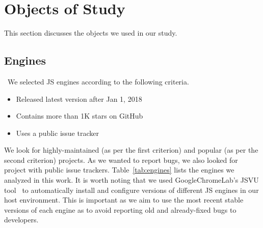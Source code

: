 \documentclass[10pt,conference,anonymous]{IEEEtran}
\begin{document}




\section{Objects of Study}
\label{sec:methodology}

This section discusses the objects we used in our study.

\subsection{Engines}
\label{sec:methodology:engines}~We selected 
JS engines according to the following criteria.

\begin{itemize}
\item Released latest version after Jan 1, 2018
\item Contains more than 1K stars on GitHub  
\item Uses a public issue tracker
\end{itemize}  

We look for highly-maintained (as per the first criterion) and popular
(as per the second criterion) projects. As we wanted to report bugs,
we also looked for project with public issue
trackers. Table~\ref{tab:engines} lists the engines we analyzed in
this work. It is worth noting that we used GoogleChromeLab's JSVU
tool~\cite{jsvu} to automatically install and configure versions of
different JS engines in our host environment. This is important as we
aim to use the most recent stable versions of each engine as to avoid
reporting old and already-fixed bugs to developers.
\end{document}
